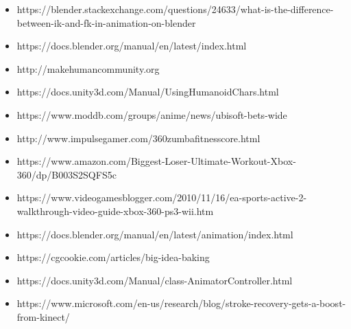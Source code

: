 \documentclass[12pt,a4paper]{report}
\begin{document}
\begin{itemize}
	\item 	https://blender.stackexchange.com/questions/24633/what-is-the-difference-between-ik-and-fk-in-animation-on-blender
	\item 	https://docs.blender.org/manual/en/latest/index.html
	\item 	http://makehumancommunity.org
	\item 	https://docs.unity3d.com/Manual/UsingHumanoidChars.html
	\item   https://www.moddb.com/groups/anime/news/ubisoft-bets-wide
	\item   http://www.impulsegamer.com/360zumbafitnesscore.html
    \item   https://www.amazon.com/Biggest-Loser-Ultimate-Workout-Xbox-360/dp/B003S2SQFS5c
    \item   https://www.videogamesblogger.com/2010/11/16/ea-sports-active-2-walkthrough-video-guide-xbox-360-ps3-wii.htm
    \item   https://docs.blender.org/manual/en/latest/animation/index.html
    \item   https://cgcookie.com/articles/big-idea-baking
    \item   https://docs.unity3d.com/Manual/class-AnimatorController.html
    \item   https://www.microsoft.com/en-us/research/blog/stroke-recovery-gets-a-boost-from-kinect/
\end{itemize}
\end{document}
